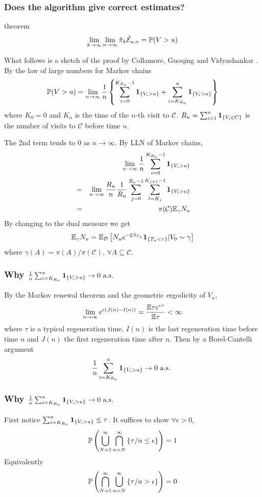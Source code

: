 \documentclass{beamer}
\begin{document}
\begin{frame}
  \frametitle{Does the algorithm give correct estimates?}
  \begin{exampleblock}{theorem}
  \[
  \lim_{k \to \infty} \lim_{n \to \infty} \hat{\pi}_k \hat{\mathcal
    E}_{u,n} = \P(V > u)
  \]
  \end{exampleblock}
  What follows is a sketch of the proof by Collamore, Guoqing and
  Vidyashankar \cite{collamore2014}. By the law of large numbers for
  Markov chains
  \[
  \P(V > u) = \lim_{n \to \infty} {1 \over n} \left\{
  \sum_{i=0}^{K_{R_n} - 1} \1{V_i > u}
  +
  \sum_{i=K_{R_n}}^{n} \1{V_i > u}
  \right\}
  \]
  where $K_0 = 0$ and $K_n$ is the time of the $n$-th visit to
  $\mathcal C$. $R_n = \sum_{i=1}^n \1{V_i \in C}$ is the number of
  visits to $\mathcal C$ before time $n$.
\end{frame}

\begin{frame}
  The 2nd term tends to 0 as $n \to \infty$. By LLN of Markov chains,
  \begin{eqnarray*}
    && \lim_{n \to \infty} {1 \over n}
    \sum_{i=0}^{K_{R_n}-1} \1{V_i > u}  \\
    &=& \lim_{n \to \infty} {R_n \over n}{1 \over R_n}
    \sum_{j=0}^{R_n-1} \sum_{l=K_j}^{K_{j+1}-1} \1{V_l > u} \\
    &=& \pi(\mathcal C) \E_\gamma N_u
  \end{eqnarray*}
  By changing to the dual measure we get
  \[
  \E_\gamma N_u = \E_{\mathcal D} \left[
    N_u e^{-\xi S_{T_u}} \1{T_u < \tau} | V_0 \sim \gamma
  \right]
  \]
  where $\gamma(A) = \pi(A) / \pi(\mathcal C)$,
  $\forall A \subseteq \mathcal C$.
\end{frame}

\begin{frame}
  \frametitle{Why ${1 \over n} \sum_{i=K_{R_n}}^n \1{V_i > u} \to 0
    \text{ a.s. }$}
  By the Markov renewal theorem and the geometric ergodicity of $V_n$,
  \[
  \lim_{n \to \infty} e^{\epsilon(J(n) - I(n))} = {
    \E \tau e^{\epsilon \tau}
    \over
    \E \tau
  }  < \infty
  \]
  where $\tau$ is a typical regeneration time, $I(n)$ is the last
  regeneration time before time $n$ and $J(n)$ the first regeneration
  time after $n$. Then by a Borel-Cantelli argument
  \[
  {1 \over n}\sum_{i=K_{R_n}}^n \1{V_i > u} \to 0 \text{ a.s. }
  \]
\end{frame}

\begin{frame}
  \frametitle{Why ${1 \over n} \sum_{i=K_{R_n}}^n \1{V_i > u} \to 0
    \text{ a.s. }$}
  First notice $ \sum_{i=K_{R_n}}^n \1{V_i > u} \leq \tau$.
  It suffices to show $\forall \epsilon > 0$,
  \[
  \P\left(
    \bigcup_{N=1}^\infty \bigcap_{n=N}^\infty \left\{
      \tau/n \leq \epsilon
      \right\}
  \right) = 1
  \]
  Equivalently
  \[
  \P\left(
    \bigcap_{N=1}^\infty \bigcup_{n=N}^\infty \left\{
      \tau/n > \epsilon
      \right\}
  \right) = 0
  \]
\end{frame}
\end{document}
